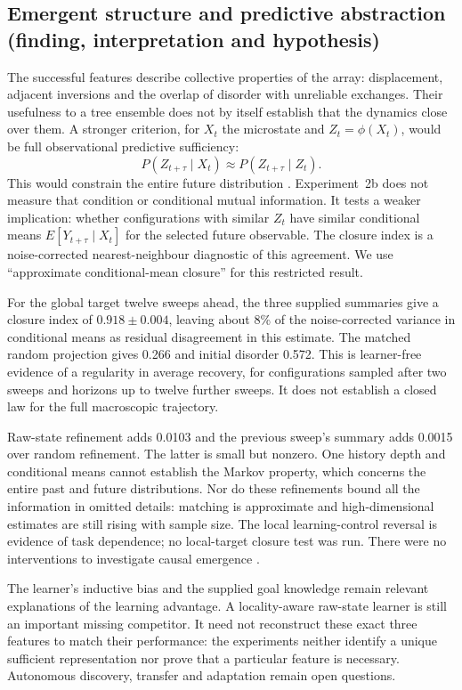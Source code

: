 \documentclass[11pt,a4paper]{article}
\begin{document}
\subsection{Emergent structure and predictive abstraction (finding, interpretation and hypothesis)}\label{sec:emergent}
The successful features describe collective properties of the array:
displacement, adjacent inversions and the overlap of disorder with unreliable
exchanges. Their usefulness to a tree ensemble does not by itself establish
that the dynamics close over them. A stronger criterion, for $X_t$ the
microstate and $Z_t=\phi(X_t)$, would be full observational predictive
sufficiency:
\begin{equation}
 P(Z_{t+\tau}\mid X_t)\approx P(Z_{t+\tau}\mid Z_t).
\end{equation}
This would constrain the entire future distribution
\citep{pfante2014,kemeny1976}. Experiment~2b does not measure that condition
or conditional mutual information. It tests a weaker implication: whether
configurations with similar $Z_t$ have similar conditional means
$E[Y_{t+\tau}\mid X_t]$ for the selected future observable. The closure index
is a noise-corrected nearest-neighbour diagnostic of this agreement. We use
``approximate conditional-mean closure'' for this restricted result.

For the global target twelve sweeps ahead, the three supplied summaries give
a closure index of $0.918\pm0.004$, leaving about 8\% of the noise-corrected
variance in conditional means as residual disagreement in this estimate.
The matched random projection gives 0.266 and initial disorder 0.572. This
is learner-free evidence of a regularity in average recovery, for
configurations sampled after two sweeps and horizons up to twelve further
sweeps. It does not establish a closed law for the full macroscopic trajectory.

Raw-state refinement adds 0.0103 and the previous sweep's summary adds 0.0015
over random refinement. The latter is small but nonzero. One history depth
and conditional means cannot establish the Markov property, which concerns
the entire past and future distributions. Nor do these refinements bound all
the information in omitted details: matching is approximate and
high-dimensional estimates are still rising with sample size. The local
learning-control reversal is evidence of task dependence; no local-target
closure test was run. There were no interventions to investigate causal
emergence \citep{hoel2017}.

The learner's inductive bias and the supplied goal knowledge remain relevant
explanations of the learning advantage. A locality-aware raw-state learner is
still an important missing competitor. It need not reconstruct these exact
three features to match their performance: the experiments neither identify
a unique sufficient representation nor prove that a particular feature is
necessary. Autonomous discovery, transfer and adaptation remain open questions.
\end{document}
